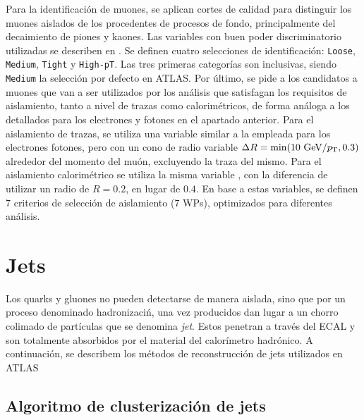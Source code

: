 Para la identificación de muones, se aplican cortes de calidad para distinguir los muones aislados de los procedentes de procesos de fondo, principalmente del decaimiento de piones y kaones.
Las variables con buen poder discriminatorio utilizadas se describen en . Se definen cuatro selecciones de identificación: \texttt{Loose}, \texttt{Medium}, \texttt{Tight} y \texttt{High-pT}. Las tres primeras categorías son inclusivas, siendo \texttt{Medium} la selección por defecto en \ac{ATLAS}. Por último, se pide a los candidatos a muones que van a ser utilizados por los análisis que satisfagan los requisitos de aislamiento, tanto a nivel de trazas como calorimétricos, de forma análoga a los detallados para los electrones y fotones en el apartado anterior. Para el aislamiento de trazas, se utiliza una variable similar a la empleada para los electrones fotones, pero con un cono de radio variable \(\Delta R = \min(10~\text{GeV}/p_{\text{T}}, 0.3)\) alrededor del momento del muón, excluyendo la traza del mismo. Para el aislamiento calorimétrico se utiliza la misma variable \etconefo, con la diferencia de utilizar un radio de \(R=0.2\), en lugar de \(0.4\). En base a estas variables, se definen 7 criterios de selección de aislamiento (7 \acp{WP}), optimizados para diferentes análisis.








\section{Jets}

Los quarks y gluones no pueden detectarse de manera aislada, sino que por un proceso denominado hadronizaci\'n, una vez producidos dan lugar a un chorro colimado de part\'iculas que se denomina \textit{jet}. Estos penetran a través del \ac{ECAL} y son totalmente absorbidos por el material del calorímetro hadrónico. A continuación, se describem los m\'etodos de reconstrucci\'on de jets utilizados en \ac{ATLAS}

\subsection{Algoritmo de clusterizaci\'on de jets \antikt}

